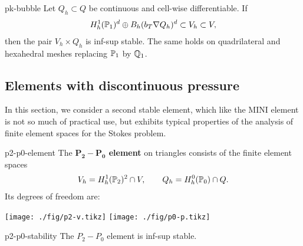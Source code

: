\begin{Corollary}{pk-bubble}
  Let $Q_h\subset Q$ be continuous and cell-wise differentiable. If
  \begin{gather*}
    H^1_h(\P_1)^d\oplus B_h(b_\cell\nabla Q_h)^d \subset V_h \subset V,
  \end{gather*}
  then the pair $V_h\times Q_h$ is inf-sup stable. The same holds on
  quadrilateral and hexahedral meshes replacing $\P_1$ by $\Q_1$.
\end{Corollary}

\subsection{Elements with discontinuous pressure}

\begin{intro}
  In this section, we consider a second stable element, which like
  the MINI element is not so much of practical use, but exhibits
  typical properties of the analysis of finite element spaces for the
  Stokes problem.
\end{intro}

\begin{Definition}{p2-p0-element}
  The \textbf{$\mathbf{P_2-P_0}$ element} on triangles consists of the finite
  element spaces
  \begin{gather}
    V_h = H^1_h(\P_2)^2 \cap V,
    \qquad
    Q_h = H^0_h(\P_0) \cap Q.
  \end{gather}
  Its degrees of freedom are:
    \begin{center}
    \texttt{[image: ./fig/p2-v.tikz]}
    \hspace{1cm}
    \texttt{[image: ./fig/p0-p.tikz]}
  \end{center}
\end{Definition}

\begin{Lemma}{p2-p0-stability}
  The $P_2-P_0$ element is inf-sup stable.
\end{Lemma}

